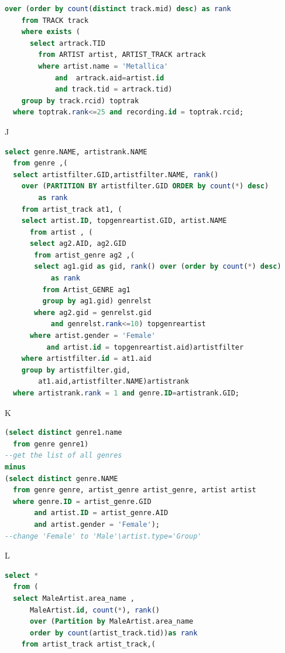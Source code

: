 \documentclass[11pt]{article} %
\begin{document}
{\begin{lstlisting}[language=SQL, keywordstyle=\color{blue!70},
commentstyle=\color{red!50!green!50!blue!50},
rulesepcolor=\color{red!20!green!20!blue!20},
frame=shadowbox]
      over (order by count(distinct track.mid) desc) as rank
    from TRACK track
    where exists (
      select artrack.TID
        from ARTIST artist, ARTIST_TRACK artrack
        where artist.name = 'Metallica'
            and  artrack.aid=artist.id
            and track.tid = artrack.tid)
    group by track.rcid) toptrak 
  where toptrak.rank<=25 and recording.id = toptrak.rcid;
\end{lstlisting}
J
\begin{lstlisting}[language=SQL, keywordstyle=\color{blue!70},
commentstyle=\color{red!50!green!50!blue!50},
rulesepcolor=\color{red!20!green!20!blue!20},
frame=shadowbox]
select genre.NAME, artistrank.NAME
  from genre ,(
  select artistfilter.GID,artistfilter.NAME, rank()
    over (PARTITION BY artistfilter.GID ORDER by count(*) desc)
        as rank
    from artist_track at1, (
    select artist.ID, topgenreartist.GID, artist.NAME
      from artist , (
      select ag2.AID, ag2.GID
       from artist_genre ag2 ,(
       select ag1.gid as gid, rank() over (order by count(*) desc)
           as rank
         from Artist_GENRE ag1
         group by ag1.gid) genrelst
       where ag2.gid = genrelst.gid
           and genrelst.rank<=10) topgenreartist
      where artist.gender = 'Female'
          and artist.id = topgenreartist.aid)artistfilter
    where artistfilter.id = at1.aid
    group by artistfilter.gid,
        at1.aid,artistfilter.NAME)artistrank
  where artistrank.rank = 1 and genre.ID=artistrank.GID;
\end{lstlisting}
K
\begin{lstlisting}[language=SQL, keywordstyle=\color{blue!70},
commentstyle=\color{red!50!green!50!blue!50},
rulesepcolor=\color{red!20!green!20!blue!20},
frame=shadowbox]
(select distinct genre1.name
  from genre genre1)
--get the list of all genres
minus
(select distinct genre.NAME
  from genre genre, artist_genre artist_genre, artist artist
  where genre.ID = artist_genre.GID
       and artist.ID = artist_genre.AID
       and artist.gender = 'Female');
--change 'Female' to 'Male'\artist.type='Group'
\end{lstlisting}
L
\begin{lstlisting}[language=SQL, keywordstyle=\color{blue!70},
commentstyle=\color{red!50!green!50!blue!50},
rulesepcolor=\color{red!20!green!20!blue!20},
frame=shadowbox]
select *
  from (
  select MaleArtist.area_name ,
      MaleArtist.id, count(*), rank()
      over (Partition by MaleArtist.area_name
      order by count(artist_track.tid))as rank
    from artist_track artist_track,(

\end{lstlisting}}
\end{document}
